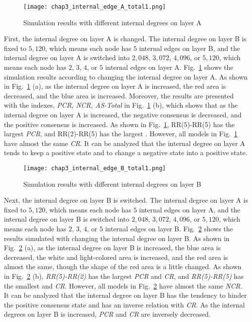 \begin{figure}[!htb]
	\centering
	\texttt{[image: chap3\_internal\_edge\_A\_total1.png]}
	\caption{Simulation results with different internal degrees on layer A}
	\label{chap3_internal_edge_A_total}
\end{figure}

First, the internal degree on layer A is changed. The internal degree on layer B is fixed to $5,120$, which means each node has $5$ internal edges on layer B, and the internal degree on layer A is switched into $2,048$, $3,072$, $4,096$, or $5,120$, which means each node has $2$, $3$, $4$, or $5$ internal edges on layer A. Fig.~\ref{chap3_internal_edge_A_total} shows the simulation results according to changing the internal degree on layer A. As shown in Fig.~\ref{chap3_internal_edge_A_total} (a), as the internal degree on layer A is increased, the red area is decreased, and the blue area is increased. Moreover, the results are presented with the indexes, \textit{PCR, NCR, AS-Total} in Fig.~\ref{chap3_internal_edge_A_total} (b), which shows that as the internal degree on layer A is increased, the negative consensus is decreased, and the positive consensus is increased. As shown in Fig.~\ref{chap3_internal_edge_A_total}, RR(5)-RR(5) has the largest \textit{PCR}, and RR(2)-RR(5) has the largest . However, all models in Fig.~\ref{chap3_internal_edge_A_total} have almost the same \textit{CR}. It can be analyzed that the internal degree on layer A tends to keep a positive state and to change a negative state into a positive state. 

\begin{figure}[!htb]
	\centering
	\texttt{[image: chap3\_internal\_edge\_B\_total1.png]}
	\caption{Simulation results with different internal degrees on layer B}
	\label{chap3_internal_edge_B_total}
\end{figure}

Next, the internal degree on layer B is switched. The internal degree on layer A is fixed to  $5,120$, which means each node has $5$ internal edges on layer A, and the internal degree on layer B is switched into $2,048$, $3,072$, $4,096$, or $5,120$, which means each node has $2$, $3$, $4$, or $5$ internal edges on layer B. Fig.~\ref{chap3_internal_edge_B_total} shows the results simulated with changing the internal degree on layer B. As shown in Fig.~\ref{chap3_internal_edge_B_total} (a), as the internal degree on layer B is increased, the blue area is decreased, the white and light-colored area is increased, and the red area is almost the same, though the shape of the red area is a little changed.  As shown in Fig.~\ref{chap3_internal_edge_B_total} (b), \textit{RR(5)-RR(2)} has the largest \textit{PCR} and \textit{CR}, and \textit{RR(5)-RR(5)} has the smallest  and \textit{CR}. However, all models in Fig.~\ref{chap3_internal_edge_B_total} have almost the same \textit{NCR}. It can be analyzed that the internal degree on layer B has the tendency to hinder the positive consensus state and has an inverse relation with \textit{CR}. As the internal degrees on layer B is increased, \textit{PCR} and \textit{CR} are inversely decreased.

